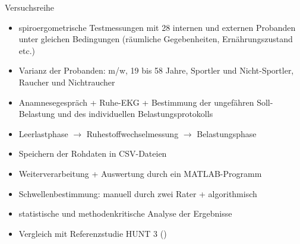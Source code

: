 \documentclass[colorBG,slideColor,8pt]{beamer}
\begin{document}
\begin{frame}{Versuchsreihe}
\begin{itemize}
	\item spiroergometrische Testmessungen mit 28 internen und externen Probanden unter gleichen Bedingungen (räumliche Gegebenheiten, Ernährungszustand etc.)
	\item Varianz der Probanden: m/w, 19 bis 58 Jahre, Sportler und Nicht-Sportler, Raucher und Nichtraucher
	\item Anamnesegespräch + Ruhe-EKG + Bestimmung der ungefähren Soll-Belastung und des individuellen Belastungsprotokolls
	\item Leerlastphase $\rightarrow$ Ruhestoffwechselmessung $\rightarrow$ Belastungsphase
	\item Speichern der Rohdaten in CSV-Dateien
	\item Weiterverarbeitung + Auswertung durch ein MATLAB-Programm
	\item Schwellenbestimmung: manuell durch zwei Rater + algorithmisch
	\item statistische und methodenkritische Analyse der Ergebnisse
	\item Vergleich mit Referenzstudie HUNT 3 (\cite{Loe.2014})
\end{itemize}
\end{frame}
\end{document}
